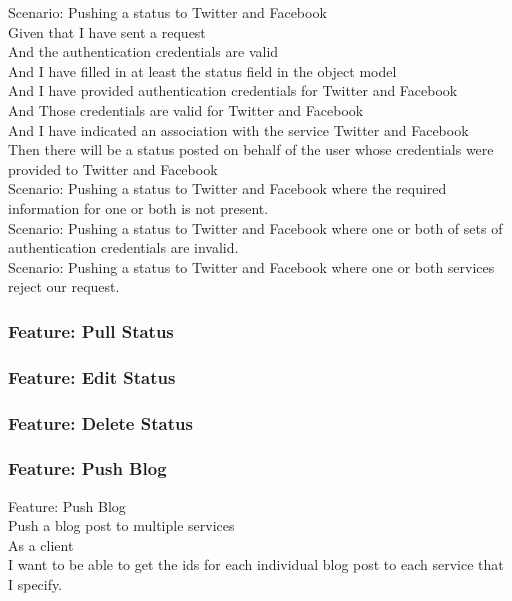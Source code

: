 \documentclass[12pt]{article}
\begin{document}
Scenario: Pushing a status to Twitter and Facebook \\
	Given that I have sent a request \\
	And the authentication credentials are valid \\
	And I have filled in at least the status field in the object model \\
	And I have provided authentication credentials for Twitter and Facebook \\ 
	And Those credentials are valid for Twitter and Facebook \\ 
	And I have indicated an association with the service Twitter and Facebook \\
	Then there will be a status posted on behalf of the user whose credentials 
	were provided to Twitter and Facebook \\

Scenario: Pushing a status to Twitter and Facebook where the required 
information for one or both is not present. \\

Scenario: Pushing a status to Twitter and Facebook where one or both of sets of 
authentication credentials are invalid. \\

Scenario: Pushing a status to Twitter and Facebook where one or both services 
reject our request. \\


\subsubsection{Feature: Pull Status}
\subsubsection{Feature: Edit Status}
\subsubsection{Feature: Delete Status}

\subsubsection{Feature: Push Blog}
Feature: Push Blog \\
	Push a blog post to multiple services \\
	As a client \\
	I want to be able to get the ids for each individual blog post to each  
	service that I specify. \\
	
\end{document}

